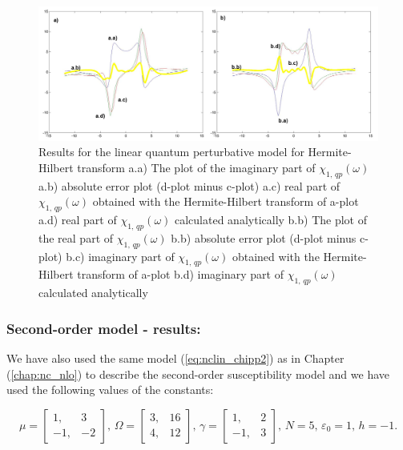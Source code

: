 \documentclass[12pt,twoside,a4paper]{article}
\numberwithin{equation}{subsection}
\numberwithin{figure}{subsection}
\begin{document}
\begin{figure}
  \includegraphics[width=150mm]{img/hht_qp1.png}
  \caption{Results for the linear quantum perturbative model for Hermite-Hilbert transform
    a.a) The plot of the imaginary part of ${\chi_{1, \,qp}}(\omega )$
    a.b) absolute error plot (d-plot minus c-plot) 
    a.c) real part of ${\chi_{1, \, qp}}(\omega )$ obtained with the Hermite-Hilbert transform of a-plot 
    a.d) real part of ${\chi_{1, \, qp}}(\omega )$ calculated analytically 
    b.b) The plot of the real part of ${\chi_{1, \, qp}}(\omega )$ 
    b.b) absolute error plot (d-plot minus c-plot) 
    b.c) imaginary part of ${\chi_{1, \, qp}}(\omega )$ obtained with the Hermite-Hilbert transform of a-plot 
    b.d) imaginary part of ${\chi_{1, \, qp}}(\omega )$ calculated analytically  
    \label{fig:hht_qp1}
  }
\end{figure}

\subsubsection*{Second-order model - results:}

We have also used the same model (\ref{eq:nclin_chipp2}) as in Chapter (\ref{chap:nc_nlo}) to describe the second-order susceptibility
model and we have used the following values of the constants: 

\begin{equation}
	\mu = \begin{bmatrix} 
    	1, & 3 \\ -1, & -2 
  	\end{bmatrix} , \, 
  	\Omega =  \begin{bmatrix}  
    	3, & 16 \\ 4, & 12 
  	\end{bmatrix} , \,
  	\gamma =  \begin{bmatrix}  
  		1, & 2 \\ -1, & 3
  	\end{bmatrix} , \, 
  	N = 5 , \, 
  	\varepsilon_0 = 1, \,
  	h = - 1 .
\end{equation}
\end{document}

